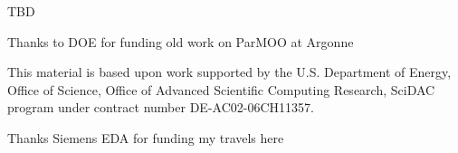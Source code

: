 \documentclass[aspectratio=169]{beamer}
\begin{document}
\begin{frame}

TBD

\bigskip

Thanks to DOE for funding old work on ParMOO at Argonne

\smallskip

{\tiny This material is based upon work supported by the U.S. Department of Energy, Office of Science, Office of Advanced Scientific Computing Research, SciDAC program under contract number DE-AC02-06CH11357.\\}

\bigskip

Thanks Siemens EDA for funding my travels here\\

\end{frame}
\end{document}
